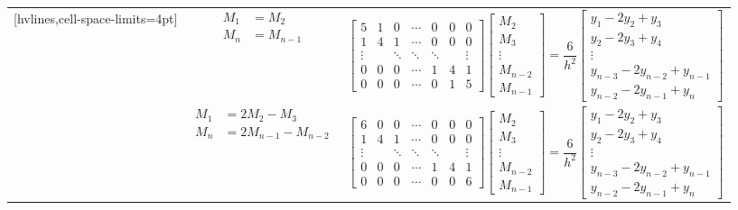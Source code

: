 \begin{table}[h!]
\begin{NiceTabular}{ccc}[hvlines,cell-space-limits=4pt]
         & $\begin{aligned} M_1 & = M_2 \\ M_n & = M_{n-1} \end{aligned}$ & $\begin{bmatrix} 5 & 1 & 0 & \cdots & 0 & 0 & 0 \\ 1 & 4 & 1 & \cdots & 0 & 0 & 0 \\ \vdots & & \ddots & \ddots & \ddots & & \vdots \\ 0 & 0 & 0 & \cdots & 1 & 4 & 1 \\ 0 & 0 & 0 & \cdots & 0 & 1 & 5 \end{bmatrix} \begin{bmatrix} M_2 \\ M_3 \\ \vdots \\ M_{n-2} \\ M_{n-1} \end{bmatrix} = \dfrac{6}{h^2} \begin{bmatrix} y_1 - 2y_2 + y_3 \\ y_2 - 2y_3 + y_4 \\ \vdots \\ y_{n-3} - 2y_{n-2} + y_{n-1} \\ y_{n-2} - 2y_{n-1} + y_n \end{bmatrix}$ \\
         & $\begin{aligned} M_1 & = 2M_2 - M_3 \\ M_n & = 2M_{n-1} - M_{n-2} \end{aligned}$ & $\begin{bmatrix} 6 & 0 & 0 & \cdots & 0 & 0 & 0 \\ 1 & 4 & 1 & \cdots & 0 & 0 & 0 \\ \vdots & & \ddots & \ddots & \ddots & & \vdots \\ 0 & 0 & 0 & \cdots & 1 & 4 & 1 \\ 0 & 0 & 0 & \cdots & 0 & 0 & 6 \end{bmatrix} \begin{bmatrix} M_2 \\ M_3 \\ \vdots \\ M_{n-2} \\ M_{n-1} \end{bmatrix} = \dfrac{6}{h^2} \begin{bmatrix} y_1 - 2y_2 + y_3 \\ y_2 - 2y_3 + y_4 \\ \vdots \\ y_{n-3} - 2y_{n-2} + y_{n-1} \\ y_{n-2} - 2y_{n-1} + y_n \end{bmatrix}$
    \end{NiceTabular}
\end{table}\vspace{-0.5cm}

